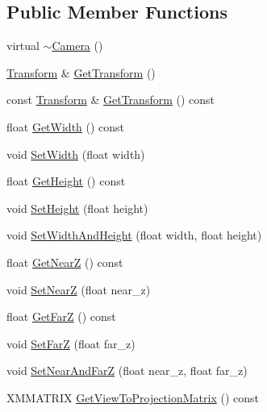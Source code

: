 \subsection*{Public Member Functions}
\begin{DoxyCompactItemize}
\item 
virtual \hyperlink{classmage_1_1_camera_ae56c0542ae1a480c7fb15d737bf16de0}{$\sim$\+Camera} ()
\item 
\hyperlink{structmage_1_1_transform}{Transform} \& \hyperlink{classmage_1_1_camera_aaa5f4f2b5b13ffb1f70b77aec8579be5}{Get\+Transform} ()
\item 
const \hyperlink{structmage_1_1_transform}{Transform} \& \hyperlink{classmage_1_1_camera_adac4b7ef332babf36e0c9f271f1fff76}{Get\+Transform} () const
\item 
float \hyperlink{classmage_1_1_camera_a2285655605035118861297b2449a3443}{Get\+Width} () const
\item 
void \hyperlink{classmage_1_1_camera_aa99e2452c6d0629e7018d32cb9d222dd}{Set\+Width} (float width)
\item 
float \hyperlink{classmage_1_1_camera_a4c6c5e96085651ce29cd6e87543d21ec}{Get\+Height} () const
\item 
void \hyperlink{classmage_1_1_camera_a53ca727373580b145339d4dd93e2c65f}{Set\+Height} (float height)
\item 
void \hyperlink{classmage_1_1_camera_a637d09eeedc8015c661751f3b192e252}{Set\+Width\+And\+Height} (float width, float height)
\item 
float \hyperlink{classmage_1_1_camera_a175e3c36526a8a3e28cd2f8bd1701c55}{Get\+NearZ} () const
\item 
void \hyperlink{classmage_1_1_camera_a4aa60bcc75822457ccb8be2ff0ce93a4}{Set\+NearZ} (float near\+\_\+z)
\item 
float \hyperlink{classmage_1_1_camera_a7f293a8711086b3419fe3b4224ff2778}{Get\+FarZ} () const
\item 
void \hyperlink{classmage_1_1_camera_aaad9cb302d7ceb2515c2a23f094a6ce9}{Set\+FarZ} (float far\+\_\+z)
\item 
void \hyperlink{classmage_1_1_camera_a1800467939c0806405e9a708dbd838f8}{Set\+Near\+And\+FarZ} (float near\+\_\+z, float far\+\_\+z)
\item 
X\+M\+M\+A\+T\+R\+IX \hyperlink{classmage_1_1_camera_a4254e1c9d65c41b27842f35870fd7960}{Get\+View\+To\+Projection\+Matrix} () const
\end{DoxyCompactItemize}
